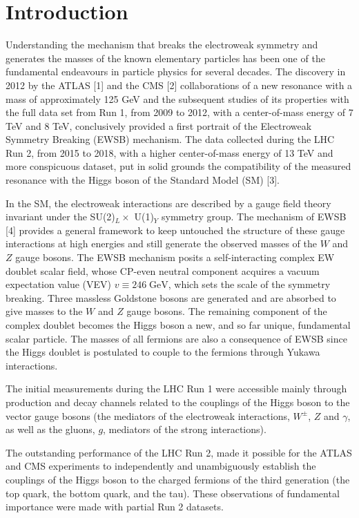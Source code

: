 \documentclass[12pt]{article}
\begin{document}
\section{Introduction}

Understanding the mechanism that breaks the electroweak symmetry and generates the masses of the known elementary particles has been one of the fundamental endeavours in particle physics for several decades. The discovery in 2012 by the ATLAS [1] and the CMS [2] collaborations of a new resonance with a mass of approximately 125 GeV and the subsequent studies of its properties with the full data set from Run 1, from 2009 to 2012, with a center-of-mass energy of 7 TeV and 8 TeV, conclusively provided a first portrait of the Electroweak Symmetry Breaking (EWSB) mechanism. The data collected during the LHC Run 2, from 2015 to 2018, with a higher center-of-mass energy of 13 TeV and more conspicuous dataset, put in solid grounds the compatibility of the measured resonance with the Higgs boson of the Standard Model (SM) [3].

In the SM, the electroweak interactions are described by a gauge field theory invariant under the SU(2)$_L\times$ U(1)$_Y$ symmetry group. The mechanism of EWSB [4] provides a general framework to keep untouched the structure of these gauge interactions at high energies and still generate the observed masses of the $W$ and $Z$ gauge bosons. The EWSB mechanism posits a self-interacting complex EW doublet scalar field, whose CP-even neutral component acquires a vacuum expectation value (VEV) $v \equiv 246 \;\text{GeV}$, which sets the scale of the symmetry breaking. Three massless Goldstone bosons are generated and are absorbed to give masses to the $W$ and $Z$ gauge bosons. The remaining component of the complex doublet becomes the Higgs boson a new, and so far unique, fundamental scalar particle. The masses of all fermions are also a consequence of EWSB since the Higgs doublet is postulated to couple to the fermions through Yukawa interactions.

The initial measurements during the LHC Run 1 were accessible mainly through production and decay channels related to the couplings of the Higgs boson to the vector gauge bosons (the mediators of the electroweak interactions, $W^\pm$, $Z$ and $\gamma$, as well as the gluons, $g$, mediators of the strong interactions).

The outstanding performance of the LHC Run 2, made it possible for the ATLAS and CMS experiments to independently and unambiguously establish the couplings of the Higgs boson to the charged fermions of the third generation (the top quark, the bottom quark, and the tau). These observations of fundamental importance were made with partial Run 2 datasets.
\end{document}
